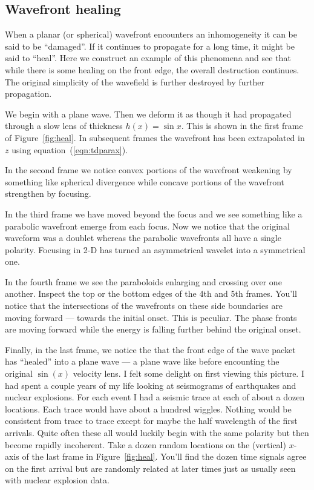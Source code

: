 \subsection{Wavefront healing}

When a planar (or spherical) wavefront encounters an inhomogeneity
it can be said to be ``damaged''.
If it continues to propagate for a long time,
it might be said to ``heal''.
Here we construct an example of this phenomena
and see that while there is some healing on the front edge,
the overall destruction continues.
The original simplicity of the wavefield is further destroyed
by further propagation.

\par
We begin with a plane wave. Then we deform it as though it
had propagated through a slow lens of thickness $h(x)=\sin x$.
This is shown in the first frame of
Figure~\ref{fig:heal}.
In subsequent frames the wavefront has been extrapolated
in $z$ using equation~(\ref{eqn:tdparax}).


\par
In the second frame we notice convex portions of the wavefront weakening
by something like spherical divergence while concave portions of
the wavefront strengthen by focusing.
\par
In the third frame we have moved beyond the focus
and we see something like a parabolic wavefront emerge from each focus.
Now we notice that the original waveform was a doublet
whereas the parabolic wavefronts all have a single polarity.
Focusing in 2-D has turned an asymmetrical wavelet into a symmetrical one.
\par
In the fourth frame we see the paraboloids enlarging and crossing over one
another.   Inspect the top or the bottom edges of the 4th and 5th frames.
You'll notice that the intersections of the wavefronts on these side
boundaries are moving forward --- towards the initial onset.
This is peculiar.  The phase fronts are moving forward while the
energy is falling further behind the original onset.

\par
Finally, in the last frame, we notice the that the front edge of
the wave packet has ``healed'' into a plane wave --- a plane wave like
before encounting the original $\sin(x)$ velocity lens.
I felt some delight on first viewing this picture.
I had spent a couple years of my life looking at seismograms
of earthquakes and nuclear explosions.
For each event I had a seismic trace at each of about a dozen locations.
Each trace would have about a hundred wiggles.
Nothing would be consistent from trace to trace except
for maybe the half wavelength of the first arrivals.
Quite often these all would luckily
begin with the same polarity
but then become rapidly incoherent.
Take a dozen random locations on the (vertical) $x$-axis
of the last frame in
Figure~\ref{fig:heal}.
You'll find the dozen time signals agree on the first arrival
but are randomly related at later times
just as usually seen with nuclear explosion data.

